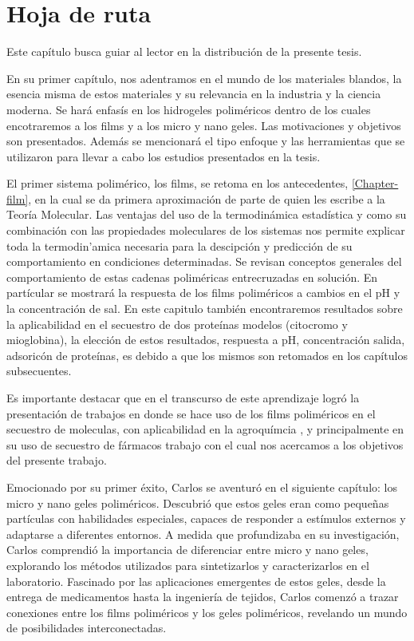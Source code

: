 \chapter{Hoja de ruta}
\label{ruta}

Este cap\'itulo busca guiar al lector en la distribución de la presente tesis. 


En su primer cap\'itulo, nos adentramos en el  mundo de los materiales blandos, la esencia misma de estos materiales y su relevancia en la industria y la ciencia moderna. Se har\'a enfas\'is en los hidrogeles polim\'ericos dentro de los cuales encotraremos a los films y a los micro y nano geles. Las motivaciones y objetivos son presentados. 
 Adem\'as se mencionar\'a el tipo enfoque y las herramientas que se utilizaron para llevar a cabo los estudios presentados en la tesis.

El primer sistema polim\'erico, los films, se retoma en los antecedentes, \ref{Chapter-film}, en la cual se da primera aproximaci\'on de parte de quien les escribe a la Teor\'ia Molecular. Las ventajas del uso de la termodin\'amica estad\'istica y como su combinaci\'on con las propiedades moleculares de los sistemas nos permite explicar toda la termodin'amica necesaria para la descipci\'on y predicci\'on de su comportamiento en condiciones determinadas.  
Se  revisan conceptos generales del comportamiento de estas cadenas polim\'ericas entrecruzadas en soluci\'on.
En part\'icular se mostrar\'a la respuesta  de los films poliméricos a cambios en el pH y la concentraci\'on de sal.  En este capitulo también encontraremos resultados sobre la aplicabilidad en el secuestro de dos prote\'inas modelos (citocromo y mioglobina), la elección de estos resultados, respuesta a pH, concentraci\'on salida, adsoric\'on de prote\'inas,  es debido a que los mismos son retomados en los cap\'itulos subsecuentes.

Es importante destacar que en  el transcurso de este aprendizaje logró la presentación de trabajos en donde se hace uso de los films polim\'ericos en el secuestro de moleculas, con aplicabilidad en la agroqu\'imcia  , y principalmente en su uso de secuestro de f\'armacos \addcite[polimainas] trabajo con el cual nos acercamos  a los objetivos del presente trabajo.


Emocionado por su primer éxito, Carlos se aventuró en el siguiente capítulo: los micro y nano geles poliméricos. Descubrió que estos geles eran como pequeñas partículas con habilidades especiales, capaces de responder a estímulos externos y adaptarse a diferentes entornos. A medida que profundizaba en su investigación, Carlos comprendió la importancia de diferenciar entre micro y nano geles, explorando los métodos utilizados para sintetizarlos y caracterizarlos en el laboratorio. Fascinado por las aplicaciones emergentes de estos geles, desde la entrega de medicamentos hasta la ingeniería de tejidos, Carlos comenzó a trazar conexiones entre los films poliméricos y los geles poliméricos, revelando un mundo de posibilidades interconectadas.

